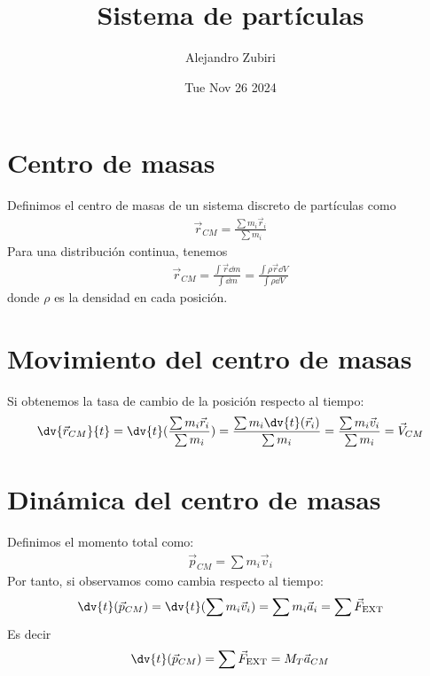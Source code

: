 \documentclass{article}
\author{Alejandro Zubiri}
\date{Tue Nov 26 2024}
\title{Sistema de partículas}
\begin{document}
\maketitle
\tableofcontents
\pagebreak
\section{Centro de masas}
Definimos el centro de masas de un sistema discreto de partículas como
\begin{equation}
    \begin{split}
        \vec{r}_{CM} = \frac{\sum m_{i} \vec{r}_{i}}{\sum m_{i}}
    \end{split}
\end{equation}
Para una distribución continua, tenemos
\begin{equation}
    \begin{split}
        \vec{r}_{CM} = \frac{ \int \vec{r} \dd{m}}{ \int  \dd{m}}
        = \frac{ \int \rho \vec{r} \dd{V}}{ \int \rho  \dd{V}}
    \end{split}
\end{equation}
donde $\rho $ es la densidad en cada posición.
\section{Movimiento del centro de masas}
Si obtenemos la tasa de cambio de la posición respecto al tiempo:
\begin{equation}
    \begin{split}
        \dv{\vec{r}_{CM}}{t} = \dv{t} (\frac{\sum m_{i} \vec{r}_{i}}{\sum m_{i}})
        = \frac{\sum m_{i} \dv{t}(\vec{r}_{i})}{\sum m_{i}}
        = \frac{\sum m_{i} \vec{v}_{i}}{\sum m_{i}} = \vec{V}_{CM}
    \end{split}
\end{equation}
\section{Dinámica del centro de masas}
Definimos el momento total como:
\begin{equation}
    \begin{split}
        \vec{p}_{CM} = \sum m_{i} \vec{v}_{i}
    \end{split}
\end{equation}
Por tanto, si observamos como cambia respecto al tiempo:
\begin{equation}
    \begin{split}
        \dv{t} (\vec{p}_{CM}) = \dv{t}(\sum m_{i} \vec{v}_{i}) = \sum m_{i} \vec{a}_i
        = \sum \vec{F}_{\text{EXT}}
    \end{split}
\end{equation}
Es decir
\begin{equation}
    \begin{split}
        \dv{t} (\vec{p}_{CM}) = \sum \vec{F}_{\text{EXT}} = M_{T} \vec{a}_{CM}
    \end{split}
\end{equation}
\end{document}
